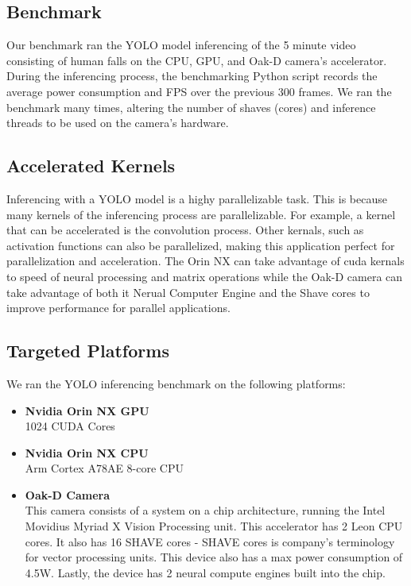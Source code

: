 \documentclass[sigconf,authorversion,nonacm]{acmart}
\begin{document}
\subsection{Benchmark}
Our benchmark ran the YOLO model inferencing of the 5 minute video consisting of human falls on the CPU, GPU, and Oak-D camera's accelerator. During the inferencing process, the benchmarking Python script records the average power consumption and FPS over the previous 300 frames. We ran the benchmark many times, altering the number of shaves (cores) and inference threads to be used on the camera's hardware.

\subsection{Accelerated Kernels}
Inferencing with a YOLO model is a highy parallelizable task. This is because many kernels of the inferencing process are parallelizable. For example, a kernel that can be accelerated is the convolution process. Other kernals, such as activation functions can also be parallelized, making this application perfect for parallelization and acceleration. The Orin NX can take advantage of cuda kernals to speed of neural processing and matrix operations while the Oak-D camera can take advantage of both it Nerual Computer Engine and the Shave cores to improve performance for parallel applications.

\subsection{Targeted Platforms}
We ran the YOLO inferencing benchmark on the following platforms:
\begin{itemize}
    \item \textbf{Nvidia Orin NX GPU} \\ 1024 CUDA Cores
    \item \textbf{Nvidia Orin NX CPU} \\ Arm Cortex A78AE 8-core CPU
    \item \textbf{Oak-D Camera} \\ This camera consists of a system on a chip architecture, running the Intel Movidius Myriad X Vision Processing unit. This accelerator has 2 Leon CPU cores. It also has 16 SHAVE cores - SHAVE cores is company's terminology for vector processing units. This device also has a max power consumption of 4.5W. Lastly, the device has 2 neural compute engines built into the chip.
\end{itemize}
\end{document}
